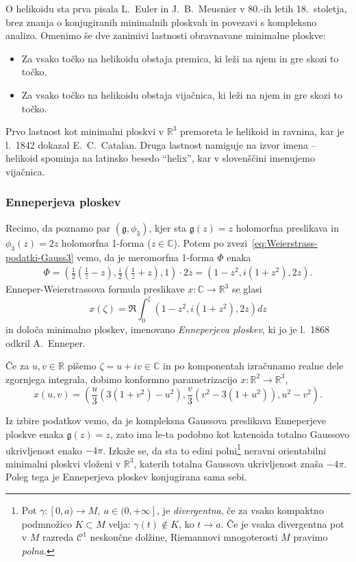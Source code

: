 \documentclass[12pt,a4paper,twoside]{article}
\theoremstyle{definition} %
\theoremstyle{plain} %
\numberwithin{equation}{section}  %
\begin{document}
O helikoidu sta prva pisala L.~Euler in J.~B.~Meusnier v 80.-ih letih 18.~stoletja, brez znanja o konjugiranih minimalnih ploskvah in povezavi s kompleksno analizo. Omenimo še dve zanimivi lastnosti obravnavane minimalne ploskve:
\begin{itemize}
\item Za vsako točko na helikoidu obstaja premica, ki leži na njem in gre skozi to točko.
\item Za vsako točko na helikoidu obstaja vijačnica, ki leži na njem in gre skozi to točko.
\end{itemize}
Prvo lastnost kot minimalni ploskvi v $\mathbb{R}^3$ premoreta le helikoid in ravnina, kar je l.~1842 dokazal E.~C.~Catalan. Druga lastnost namiguje na izvor imena -- helikoid spominja na latinsko besedo ``helix'', kar v slovenščini imenujemo vijačnica.

\subsubsection{Enneperjeva ploskev}
%
Recimo, da poznamo par $(\mathfrak{g}, \phi_3)$, kjer sta $\mathfrak{g}(z) = z$ holomorfna preslikava in $\phi_3(z) = 2z$ holomorfna 1-forma ($z \in \mathbb{C}$).
Potem po zvezi~\eqref{eq:Weierstrass-podatki-Gauss3} vemo, da je meromorfna 1-forma $\Phi$ enaka
\begin{gather*}
\Phi = \left( \frac{1}{2} \left( \frac{1}{z} - z \right), \frac{i}{2} \left( \frac{1}{z} + z \right), 1 \right) \cdot 2z = \left( 1-z^2, i(1+z^2), 2z \right).
\end{gather*}
Enneper-Weierstrassova formula preslikave $x \colon \mathbb{C} \to \mathbb{R}^3$ se glasi
\begin{equation}
x(\zeta) = \Re \int_{0}^{\zeta} \left( 1-z^2, i(1+z^2), 2z \right) dz
\end{equation}
in določa minimalno ploskev, imenovano \emph{Enneperjeva ploskev}, ki jo je l.~1868 odkril A.~Enneper.

Če za $ u,v \in \mathbb{R}$ pišemo $\zeta = u + iv \in \mathbb{C}$ in po komponentah izračunamo realne dele zgornjega integrala, dobimo konformno parametrizacijo $x \colon \mathbb{R}^2 \to \mathbb{R}^3$,
\begin{equation}
x(u,v) = \left( \frac{u}{3} \left(3(1+v^2) - u^2 \right), \frac{v}{3} \left( v^2 - 3(1+u^2) \right), u^2 - v^2 \right).
\end{equation}

Iz izbire podatkov vemo, da je kompleksna Gaussova preslikava Enneperjeve ploskve enaka $\mathfrak{g}(z) = z$, zato ima le-ta podobno kot katenoida totalno Gaussovo ukrivljenost enako $-4 \pi$. Izkaže se, da sta to edini polni\footnote{Pot $\gamma \colon [0,a) \to M, \ a \in (0,+\infty]$, je \emph{divergentna}, če za vsako kompaktno podmnožico $K \subset M$ velja: $\gamma(t) \notin K$, ko $t \to a$. Če je vsaka divergentna pot v $M$ razreda $\mathcal{C}^{1}$ neskončne dolžine, Riemannovi mnogoterosti $M$ pravimo \emph{polna}.} neravni orientabilni minimalni ploskvi vloženi v $\mathbb{R}^3$, katerih totalna Gaussova ukrivljenost znaša $-4 \pi$. Poleg tega je Enneperjeva ploskev konjugirana sama sebi.
\end{document}
